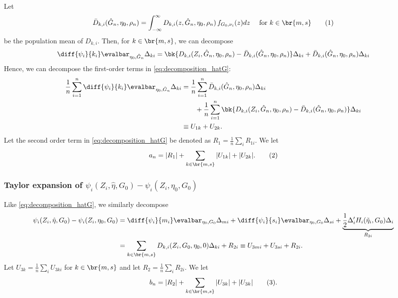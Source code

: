 \documentclass[12pt, reqno]{amsart}
\newcommand\numberthis{\addtocounter{equation}{1}\tag{\theequation}}
\numberwithin{equation}{section}
\begin{document}
\begin{refsection}
\begin{appendices}
Let \[
\bar D_{k,i} (\hat G_n, \eta_0, \rho_n) = \int_{-\infty}^{\infty} D_{k,i}(z,
\hat G_n, \eta_0, \rho_n) \, f_{G_0, \nu_i}(z) dz \quad \text{ for $k \in
\br{m,s}$} \numberthis \label{eq:D_bar_def}
\]
be the population mean of $D_{k,i}$.
Then, for $k \in
\br{m,s}$, we can decompose \[
\diff{\psi_i}{k_i}\evalbar_{\eta_0, \hat G_n} \Delta_{ki} =
\bk{
    D_{k,i} (Z_i, \hat G_n, \eta_0, \rho_n) - \bar D_{k,i} (\hat G_n,
    \eta_0, \rho_n)
} \Delta_{ki} + \bar D_{k,i} (\hat G_n,
    \eta_0, \rho_n) \Delta_{ki}
\]
Hence, we can decompose the first-order terms in \eqref{eq:decomposition_hatG}:
\begin{align*}
\frac{1}{n} \sum_{i=1}^n \diff{\psi_i}{k_i}\evalbar_{\eta_0, \hat G_n}
\Delta_{ki} & =  \frac1n \sum_{i=1}^n \bar D_{k,i} (\hat G_n,
    \eta_0, \rho_n) \Delta_{ki} \\
    &\quad\quad+ \frac1n \sum_{i=1}^n \bk{
    D_{k,i} (Z_i, \hat G_n, \eta_0, \rho_n) - \bar D_{k,i} (\hat G_n,
    \eta_0, \rho_n)
} \Delta_{ki} \\ &\equiv U_{1k} + U_{2k} .
\end{align*}
Let the second order term in \eqref{eq:decomposition_hatG} be denoted as $R_1 = \frac1n
\sum_i R_ {1i}$. We let \[a_n = |R_1| + \sum_{k
\in \br{m,s}} |U_{1k}| + |U_{2k}| .
\numberthis \label{eq:an_defn}
\]

\subsubsection{Taylor expansion of $\psi_i(Z_i, \hat\eta, G_0) - \psi_i(Z_i, \eta_0,
G_0)$}
Like \eqref{eq:decomposition_hatG}, we similarly decompose \begin{align}
\psi_i(Z_i, \hat \eta, G_0) - \psi_i(Z_i, \eta_0, G_0) &= \diff{\psi_i}{m_i}\evalbar_
{\eta_0, G_0} \Delta_{mi} + \diff{\psi_i}{s_i}\evalbar_
{\eta_0, G_0} \Delta_{si} + \underbrace{\frac{1}{2} \Delta_i' H_i(\tilde\eta_i,
G_0)
\Delta_i}_{R_{2i}} \\
&= \sum_{k\in \br{m,s}} D_{k,i}(Z_i, G_0, \eta_0, 0) \Delta_{ki} + R_{2i}  \equiv U_{3mi} + U_{3si} + R_{2i}.
\end{align}
Let $U_{3k} = \frac{1}{n}\sum_i U_{3ki}$ for $k \in \br{m,s}$ and let $R_2 = \frac{1}{n}
\sum_i R_{2i}$. We let \[b_n = |R_2| + \sum_{k \in \br{m,s}} |U_{3k}| + |U_{3k}|
\numberthis \label{eq:bn_defn}.\]


\end{appendices}
\end{refsection}
\end{document}

